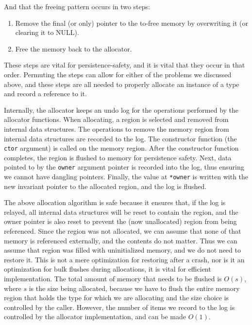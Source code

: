 And that the freeing pattern occurs in two steps:

\begin{enumerate}
    \item Remove the final (or only) pointer to the to-free memory by overwriting it (or clearing it to NULL).
    \item Free the memory back to the allocator.
\end{enumerate}

These steps are vital for persistence-safety, and it is vital that they occur in that order. Permuting the steps can
allow for either of the problems we discussed above, and these steps are all needed to properly allocate an instance of
a type and record a reference to it.

Internally, the allocator keeps an undo log for the operations performed by the allocator functions. When allocating, a
region is selected and removed from internal data structures. The operations to remove the memory region from internal
data structures are recorded to the log. The constructor function (the \texttt{ctor} argument) is called on the memory region. After the constructor
function completes, the region is flushed to memory for persistence safety. Next, data pointed to by the \texttt{owner}
argument pointer is recorded into the log, thus ensuring we cannot have dangling pointers. Finally, the value at
\texttt{*owner} is written with the new invariant pointer to the allocated region, and the log is flushed.

The above allocation algorithm is safe because it ensures that, if the log is relayed, all internal data structures will
be reset to contain the region, and the owner pointer is also reset to prevent the (now unallocated) region from being
referenced. Since the region was not allocated, we can assume that none of that memory is referenced externally, and the
contents do not matter. Thus we
can assume that region was filled with uninitialized memory, and we do not need to restore it. This
is not a mere optimization for restoring after a crash, nor is it an optimization for bulk flushes during allocations,
it is vital for efficient implementation. The total amount of memory that needs to be flushed is $O(s)$, where $s$ is
the size being allocated, because we have to flush the entire memory region that holds the type for which we are
allocating and the size choice is controlled by the caller. However, the number of items we record to the log is
controlled by the allocator implementation, and can be made $O(1)$.

